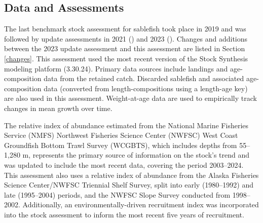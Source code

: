 \documentclass[
  english,
]{article}
\begin{document}
\subsection*{Data and Assessments}\label{data-and-assessments}

The last benchmark stock assessment for sablefish took place in 2019 and
was followed by update assessments in 2021
() and 2023
(). Changes and
additions between the 2023 update assessment and this assessment are
listed in Section \ref{changes}. This assessment used the most recent
version of the Stock Synthesis modeling platform (3.30.24). Primary data
sources include landings and age-composition data from the retained
catch. Discarded sablefish and associated age-composition data
(converted from length-compositions using a length-age key) are also
used in this assessment. Weight-at-age data are used to empirically
track changes in mean growth over time.

The relative index of abundance estimated from the National Marine
Fisheries Service (NMFS) Northwest Fisheries Science Center (NWFSC) West
Coast Groundfish Bottom Trawl Survey (WCGBTS), which includes depths
from 55--1,280 m, represents the primary source of information on the
stock's trend and was updated to include the most recent data, covering
the period 2003--2024. This assessment also uses a relative index of
abundance from the Alaska Fisheries Science Center/NWFSC Triennial Shelf
Survey, split into early (1980--1992) and late (1995--2004) periods, and
the NWFSC Slope Survey conducted from 1998--2002. Additionally, an
environmentally-driven recruitment index was incorporated into the stock
assessment to inform the most recent five years of recruitment.
\end{document}
